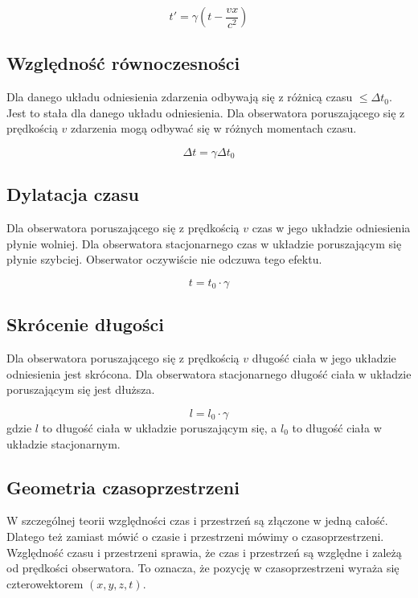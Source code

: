 \documentclass{../notatki}
\begin{document}
$$
t' = \gamma(t - \frac{vx}{c^2})
$$

\subsection{Względność równoczesności}

Dla danego układu odniesienia zdarzenia odbywają się z różnicą czasu
$\le \Delta t_0$. Jest to stała dla danego układu odniesienia.
Dla obserwatora poruszającego się z prędkością $v$ zdarzenia
mogą odbywać się w różnych momentach czasu.

$$
\Delta t = \gamma \Delta t_0
$$

\subsection{Dylatacja czasu}

Dla obserwatora poruszającego się z prędkością $v$ czas w jego układzie
odniesienia płynie wolniej. Dla obserwatora stacjonarnego czas w układzie
poruszającym się płynie szybciej. Obserwator oczywiście nie odczuwa tego
efektu.

$$
t = t_0 \cdot \gamma
$$

\subsection{Skrócenie długości}

Dla obserwatora poruszającego się z prędkością $v$ długość ciała w jego
układzie odniesienia jest skrócona. Dla obserwatora stacjonarnego długość
ciała w układzie poruszającym się jest dłuższa.

$$
l = l_0 \cdot \gamma
$$
gdzie $l$ to długość ciała w układzie poruszającym się, a $l_0$ to długość
ciała w układzie stacjonarnym.

\subsection{Geometria czasoprzestrzeni}

W szczególnej teorii względności czas i przestrzeń są złączone w jedną
całość. Dlatego też zamiast mówić o czasie i przestrzeni mówimy o
czasoprzestrzeni.
Względność czasu i przestrzeni sprawia, że czas i przestrzeń są względne
i zależą od prędkości obserwatora. To oznacza, że pozycję w czasoprzestrzeni
wyraża się czterowektorem $(x, y, z, t)$.
\end{document}
